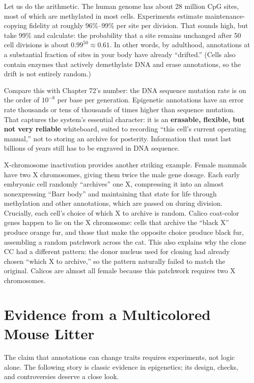 \begin{qiaoliang}
Let us do the arithmetic. The human genome has about 28 million CpG sites, most of which are methylated in most cells. Experiments estimate maintenance-copying fidelity at roughly 96\%--99\% per site per division. That sounds high, but take 99\% and calculate: the probability that a site remains unchanged after 50 cell divisions is about $0.99^{50}\approx 0.61$. In other words, by adulthood, annotations at a substantial fraction of sites in your body have already ``drifted.'' (Cells also contain enzymes that actively demethylate DNA and erase annotations, so the drift is not entirely random.)

Compare this with Chapter 72's number: the DNA sequence mutation rate is on the order of $10^{-8}$ per base per generation. Epigenetic annotations have an error rate thousands or tens of thousands of times higher than sequence mutation. That captures the system's essential character: it is an \textbf{erasable, flexible, but not very reliable} whiteboard, suited to recording ``this cell's current operating manual,'' not to storing an archive for posterity. Information that must last billions of years still has to be engraved in DNA sequence.
\end{qiaoliang}

X-chromosome inactivation provides another striking example. Female mammals have two X chromosomes, giving them twice the male gene dosage. Each early embryonic cell randomly ``archives'' one X, compressing it into an almost nonexpressing ``Barr body'' and maintaining that state for life through methylation and other annotations, which are passed on during division. Crucially, each cell's choice of which X to archive is random. Calico coat-color genes happen to lie on the X chromosome: cells that archive the ``black X'' produce orange fur, and those that make the opposite choice produce black fur, assembling a random patchwork across the cat. This also explains why the clone CC had a different pattern: the donor nucleus used for cloning had already chosen ``which X to archive,'' so the pattern naturally failed to match the original. Calicos are almost all female because this patchwork requires two X chromosomes.

\section{Evidence from a Multicolored Mouse Litter}

The claim that annotations can change traits requires experiments, not logic alone. The following story is classic evidence in epigenetics; its design, checks, and controversies deserve a close look.


